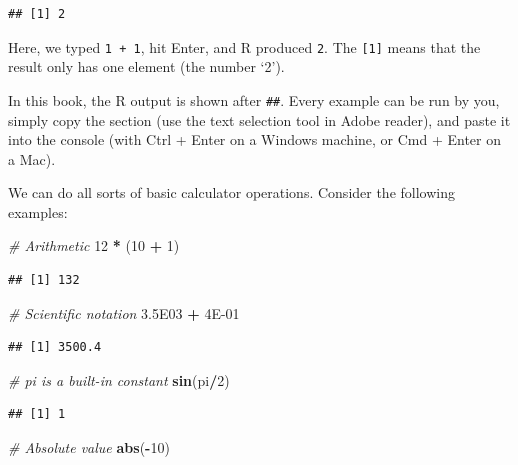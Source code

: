 \documentclass[]{book}
\newenvironment{Shaded}{\begin{snugshade}}{\end{snugshade}}
\newcommand{\CommentTok}[1]{\textcolor[rgb]{0.56,0.35,0.01}{\textit{#1}}}
\newcommand{\DecValTok}[1]{\textcolor[rgb]{0.00,0.00,0.81}{#1}}
\newcommand{\FloatTok}[1]{\textcolor[rgb]{0.00,0.00,0.81}{#1}}
\newcommand{\KeywordTok}[1]{\textcolor[rgb]{0.13,0.29,0.53}{\textbf{#1}}}
\newcommand{\NormalTok}[1]{#1}
\newcommand{\OperatorTok}[1]{\textcolor[rgb]{0.81,0.36,0.00}{\textbf{#1}}}
\newcommand{\StringTok}[1]{\textcolor[rgb]{0.31,0.60,0.02}{#1}}
\begin{document}
\begin{verbatim}
## [1] 2
\end{verbatim}

Here, we typed \texttt{1\ +\ 1}, hit Enter, and R produced \texttt{2}. The \texttt{{[}1{]}} means that the result only has one element (the number `2').

In this book, the R output is shown after \texttt{\#\#}. Every example can be run by you, simply copy the section (use the text selection tool in Adobe reader), and paste it into the console (with Ctrl + Enter on a Windows machine, or Cmd + Enter on a Mac).

We can do all sorts of basic calculator operations. Consider the following examples:

\begin{Shaded}
\begin{Highlighting}[]
\CommentTok{# Arithmetic}
\DecValTok{12} \OperatorTok{*}\StringTok{ }\NormalTok{(}\DecValTok{10} \OperatorTok{+}\StringTok{ }\DecValTok{1}\NormalTok{)}
\end{Highlighting}
\end{Shaded}

\begin{verbatim}
## [1] 132
\end{verbatim}

\begin{Shaded}
\begin{Highlighting}[]
\CommentTok{# Scientific notation}
\FloatTok{3.5E03} \OperatorTok{+}\StringTok{ }\FloatTok{4E-01}
\end{Highlighting}
\end{Shaded}

\begin{verbatim}
## [1] 3500.4
\end{verbatim}

\begin{Shaded}
\begin{Highlighting}[]
\CommentTok{# pi is a built-in constant}
\KeywordTok{sin}\NormalTok{(pi}\OperatorTok{/}\DecValTok{2}\NormalTok{)}
\end{Highlighting}
\end{Shaded}

\begin{verbatim}
## [1] 1
\end{verbatim}

\begin{Shaded}
\begin{Highlighting}[]
\CommentTok{# Absolute value}
\KeywordTok{abs}\NormalTok{(}\OperatorTok{-}\DecValTok{10}\NormalTok{)}
\end{Highlighting}
\end{Shaded}
\end{document}
